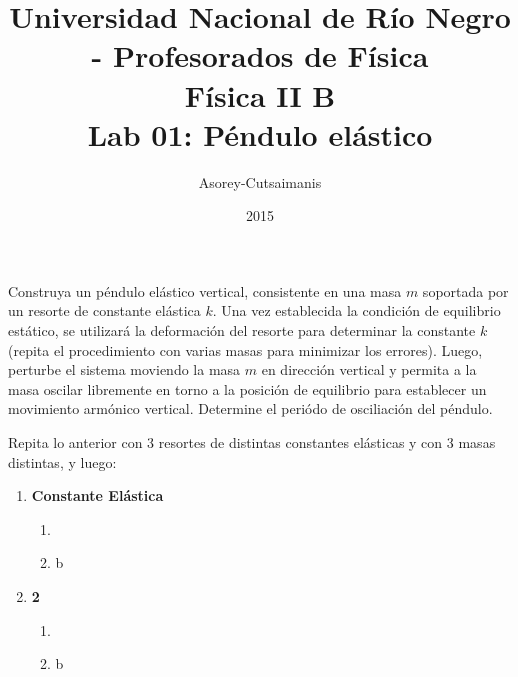 \documentclass[a4paper,12pt]{article}
\begin{document}
\title{
{\normalsize{Universidad Nacional de Río Negro - Profesorados de Física}}\\
Física II B \\ Lab 01: Péndulo elástico\\}
\author{Asorey-Cutsaimanis}
\date{2015}
\maketitle

\section{}

Construya un péndulo elástico vertical, consistente en una masa $m$ soportada por un resorte de constante elástica $k$. Una vez establecida la condición de equilibrio estático, se utilizará la deformación del resorte para determinar la constante $k$ (repita el procedimiento con varias masas para minimizar los errores). Luego, perturbe el sistema moviendo la masa $m$ en dirección vertical y permita a la masa oscilar libremente en torno a la posición de equilibrio para establecer un movimiento armónico vertical. Determine el periódo de osciliación del péndulo.

Repita lo anterior con 3 resortes de distintas constantes elásticas y con 3 masas distintas, y luego: 

\begin{enumerate}
	\item {\bf{Constante Elástica}}
		\begin{enumerate}
			\item   
			\item b
		\end{enumerate}
	\item {\bf{2}}
		\begin{enumerate}
			\item 
			\item b
		\end{enumerate}
\end{enumerate}
\end{document}
